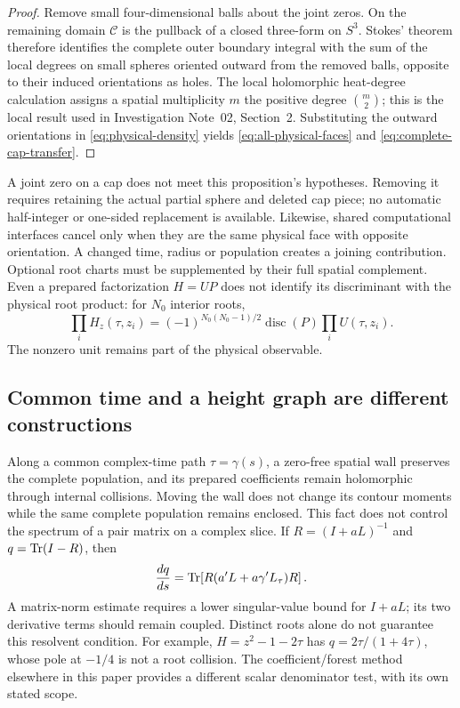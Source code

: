 \begin{proof}
Remove small four-dimensional balls about the joint zeros.  On the
remaining domain $\mathcal C$ is the pullback of a closed three-form on
$S^3$.  Stokes' theorem therefore identifies the complete outer boundary
integral with the sum of the local degrees on small spheres oriented outward
from the removed balls, opposite to their induced orientations as holes.  The
local holomorphic heat-degree calculation assigns a spatial multiplicity
$m$ the positive degree $\binom m2$; this is the local result used in
Investigation Note~02, Section~2.  Substituting the outward orientations in
\eqref{eq:physical-density} yields \eqref{eq:all-physical-faces} and
\eqref{eq:complete-cap-transfer}.
\end{proof}

A joint zero on a cap does not meet this proposition's hypotheses.
Removing it requires retaining the actual partial sphere and deleted cap
piece; no automatic half-integer or one-sided replacement is available.
Likewise, shared computational interfaces cancel only when they are the
same physical face with opposite orientation.  A changed time, radius or
population creates a joining contribution.  Optional root charts must be
supplemented by their full spatial complement.  Even a prepared
factorization $H=UP$ does not identify its discriminant with the physical
root product: for $N_0$ interior roots,
\[
 \prod_iH_z(\tau,z_i)
 =(-1)^{N_0(N_0-1)/2}\operatorname{disc}(P)\prod_iU(\tau,z_i).
\]
The nonzero unit remains part of the physical observable.

\subsection{Common time and a height graph are different constructions}

Along a common complex-time path $\tau=\gamma(s)$, a zero-free spatial wall
preserves the complete population, and its prepared coefficients remain
holomorphic through internal collisions.  Moving the wall does not change
its contour moments while the same complete population remains enclosed.
This fact does not control the spectrum of a pair matrix on a complex
slice.  If $R=(I+aL)^{-1}$ and $q=\operatorname{Tr}(I-R)$, then
\[
 \frac{dq}{ds}=\operatorname{Tr}\!\left[R(a'L+a\gamma'L_\tau)R\right].
\]
A matrix-norm estimate requires a lower singular-value bound for $I+aL$;
its two derivative terms should remain coupled.  Distinct roots alone do
not guarantee this resolvent condition.  For example,
$H=z^2-1-2\tau$ has $q=2\tau/(1+4\tau)$, whose pole at $-1/4$ is not a
root collision.  The coefficient/forest method elsewhere in this paper
provides a different scalar denominator test, with its own stated scope.

